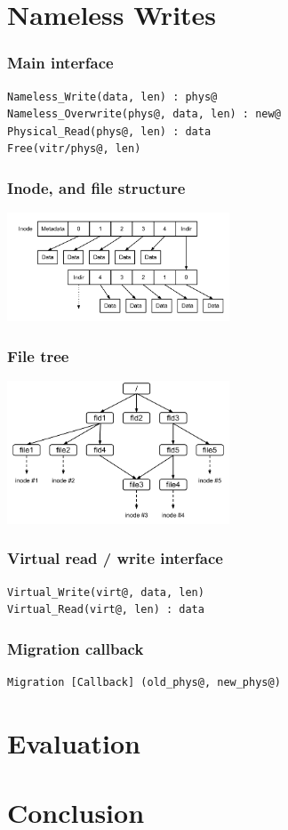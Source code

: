 \documentclass{beamer}
\begin{document}
\section{Nameless Writes}
\begin{frame}[fragile]
  \frametitle{Main interface}
  \begin{lstlisting}
Nameless_Write(data, len) : phys@
Nameless_Overwrite(phys@, data, len) : new@
Physical_Read(phys@, len) : data
Free(vitr/phys@, len)
  \end{lstlisting}
\end{frame}

\begin{frame}
  \frametitle{Inode, and file structure}
  \begin{center}
  \includegraphics[width=250px]{inode2.png}
  \end{center}
\end{frame}

\begin{frame}
  \frametitle{File tree}
  \begin{center}
  \includegraphics[width=250px]{file_tree.png}
  \end{center}
\end{frame}

\begin{frame}[fragile]
  \frametitle{Virtual read / write interface}
  \begin{lstlisting}
Virtual_Write(virt@, data, len)
Virtual_Read(virt@, len) : data
  \end{lstlisting}
\end{frame}

\begin{frame}[fragile]
  \frametitle{Migration callback}
  \begin{lstlisting}
Migration [Callback] (old_phys@, new_phys@)
  \end{lstlisting}
\end{frame}

\section{Evaluation}
\begin{frame}
\end{frame}

\section{Conclusion}
\begin{frame}
\end{frame}
\end{document}
